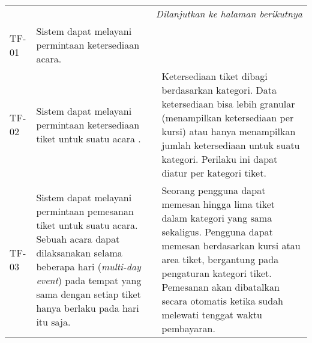 \begin{longtable}{|l|p{}|p{}|}
    \hline
    \multicolumn{3}{|r|}{\textit{Dilanjutkan ke halaman berikutnya}}                                                                                                                                                                                                                                                                                                                                                                                                                                                                                                                                      \\
    \endfoot

    \hline
    \endlastfoot

    \hline
    TF-01       & Sistem dapat melayani permintaan ketersediaan acara.                                                                                                                                                                            &                                                                                                                                                                                                                                                                                                                                                       \\
    \hline
    \hline
    TF-02       & Sistem dapat melayani permintaan ketersediaan tiket untuk suatu acara .                                                                                                                                                         & Ketersediaan tiket dibagi berdasarkan kategori. Data ketersediaan bisa lebih granular (menampilkan ketersediaan per kursi) atau hanya menampilkan jumlah ketersediaan untuk suatu kategori. Perilaku ini dapat diatur per kategori tiket.                                                                                                             \\
    \hline
    \hline
    TF-03       & Sistem dapat melayani permintaan pemesanan tiket untuk suatu acara. Sebuah acara dapat dilaksanakan selama beberapa hari (\textit{multi-day event}) pada tempat yang sama dengan setiap tiket hanya berlaku pada hari itu saja. & Seorang pengguna dapat memesan hingga lima tiket dalam kategori yang sama sekaligus. Pengguna dapat memesan berdasarkan kursi atau area tiket, bergantung pada pengaturan kategori tiket. Pemesanan akan dibatalkan secara otomatis ketika sudah melewati tenggat waktu pembayaran.                                                                   \\

\end{longtable}
